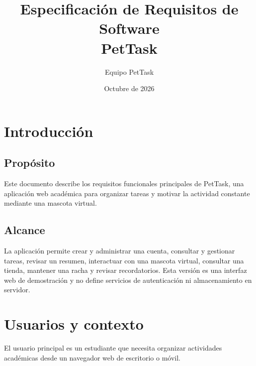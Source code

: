 \documentclass[12pt]{article}
\title{Especificación de Requisitos de Software\\PetTask}
\author{Equipo PetTask}
\date{Octubre de 2026}
\begin{document}
\maketitle
\section{Introducción}
\subsection{Propósito}
Este documento describe los requisitos funcionales principales de PetTask, una aplicación web académica para organizar tareas y motivar la actividad constante mediante una mascota virtual.
\subsection{Alcance}
La aplicación permite crear y administrar una cuenta, consultar y gestionar tareas, revisar un resumen, interactuar con una mascota virtual, consultar una tienda, mantener una racha y revisar recordatorios. Esta versión es una interfaz web de demostración y no define servicios de autenticación ni almacenamiento en servidor.
\section{Usuarios y contexto}
El usuario principal es un estudiante que necesita organizar actividades académicas desde un navegador web de escritorio o móvil.
\end{document}
